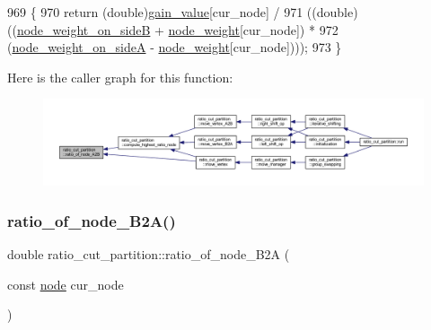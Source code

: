 \begin{DoxyCode}
969 \{
970     \textcolor{keywordflow}{return} (\textcolor{keywordtype}{double})\mbox{\hyperlink{classratio__cut__partition_af24ff191abbb0578f0bfc54fef5f6d45}{gain\_value}}[cur\_node] / 
971     ((double)((\mbox{\hyperlink{classratio__cut__partition_aa16d1b508db86eb0ba4824642394999a}{node\_weight\_on\_sideB}} + \mbox{\hyperlink{classratio__cut__partition_a4d9d2a9317a062f839ea7155c37b173f}{node\_weight}}[cur\_node]) *
972         (\mbox{\hyperlink{classratio__cut__partition_af1b839e48e498cf8ca93c8ec5df8a686}{node\_weight\_on\_sideA}} - \mbox{\hyperlink{classratio__cut__partition_a4d9d2a9317a062f839ea7155c37b173f}{node\_weight}}[cur\_node])));
973 \}
\end{DoxyCode}
Here is the caller graph for this function\+:\nopagebreak
\begin{figure}[H]
\begin{center}
\leavevmode
\includegraphics[width=350pt]{classratio__cut__partition_add7d355bd4df2cf6fa77ddc791692c88_icgraph}
\end{center}
\end{figure}
\mbox{\label{classratio__cut__partition_a094de379f453978db56695d53f6bc536}} 
\subsubsection{\texorpdfstring{ratio\+\_\+of\+\_\+node\+\_\+\+B2\+A()}{ratio\_of\_node\_B2A()}}
{\footnotesize\ttfamily double ratio\+\_\+cut\+\_\+partition\+::ratio\+\_\+of\+\_\+node\+\_\+\+B2A (\begin{DoxyParamCaption}\item[{const \mbox{\hyperlink{classnode}{node}}}]{cur\+\_\+node }\end{DoxyParamCaption})\hspace{0.3cm}{\ttfamily [protected]}}



